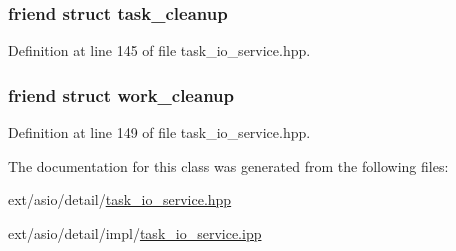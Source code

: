 \subsubsection[{task\+\_\+cleanup}]{\setlength{\rightskip}{0pt plus 5cm}friend struct {\bf task\+\_\+cleanup}\hspace{0.3cm}{\ttfamily [friend]}}\label{classasio_1_1detail_1_1task__io__service_a4da41e8803e9cdda504ad01b308155af}


Definition at line 145 of file task\+\_\+io\+\_\+service.\+hpp.

\hypertarget{classasio_1_1detail_1_1task__io__service_a9e2a288602d993c85a8fd5bc70de607e}{}
\subsubsection[{work\+\_\+cleanup}]{\setlength{\rightskip}{0pt plus 5cm}friend struct {\bf work\+\_\+cleanup}\hspace{0.3cm}{\ttfamily [friend]}}\label{classasio_1_1detail_1_1task__io__service_a9e2a288602d993c85a8fd5bc70de607e}


Definition at line 149 of file task\+\_\+io\+\_\+service.\+hpp.



The documentation for this class was generated from the following files\+:\begin{DoxyCompactItemize}
\item 
ext/asio/detail/\hyperlink{task__io__service_8hpp}{task\+\_\+io\+\_\+service.\+hpp}\item 
ext/asio/detail/impl/\hyperlink{task__io__service_8ipp}{task\+\_\+io\+\_\+service.\+ipp}\end{DoxyCompactItemize}
